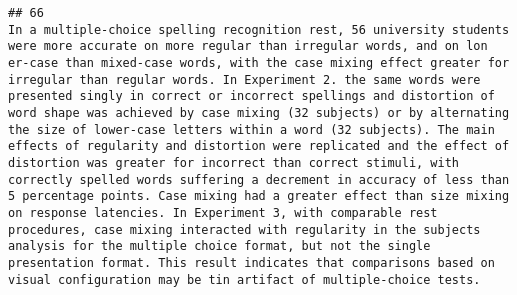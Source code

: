\documentclass[
  english,
  man]{apa6}
\begin{document}
\begin{verbatim}
## 66                                                                                                                                                                                                                                                                                                                                                                                                                                                                                                                                                                                                                                                                                                                                                                                                                                                                                                                                                                                                                                                                                                                                                                                                                                                                                                                                                                                                                                                                                                                                            In a multiple-choice spelling recognition rest, 56 university students were more accurate on more regular than irregular words, and on lon er-case than mixed-case words, with the case mixing effect greater for irregular than regular words. In Experiment 2. the same words were presented singly in correct or incorrect spellings and distortion of word shape was achieved by case mixing (32 subjects) or by alternating the size of lower-case letters within a word (32 subjects). The main effects of regularity and distortion were replicated and the effect of distortion was greater for incorrect than correct stimuli, with correctly spelled words suffering a decrement in accuracy of less than 5 percentage points. Case mixing had a greater effect than size mixing on response latencies. In Experiment 3, with comparable rest procedures, case mixing interacted with regularity in the subjects analysis for the multiple choice format, but not the single presentation format. This result indicates that comparisons based on visual configuration may be tin artifact of multiple-choice tests.

\end{verbatim}
\end{document}
